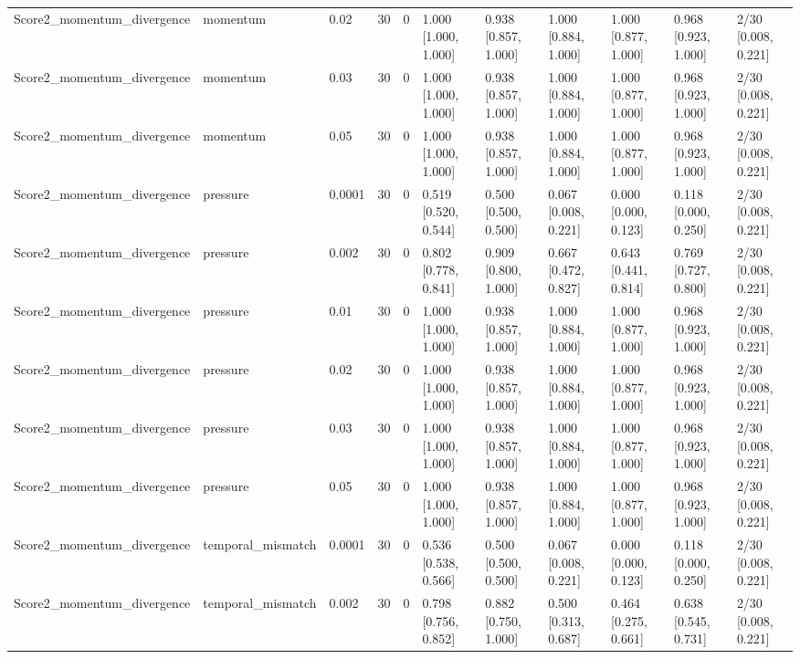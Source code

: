 \begin{longtable}{lllllllllll}
Score2\_momentum\_divergence & momentum & 0.02 & 30 & 0 & 1.000 [1.000, 1.000] & 0.938 [0.857, 1.000] & 1.000 [0.884, 1.000] & 1.000 [0.877, 1.000] & 0.968 [0.923, 1.000] & 2/30 [0.008, 0.221] \\
Score2\_momentum\_divergence & momentum & 0.03 & 30 & 0 & 1.000 [1.000, 1.000] & 0.938 [0.857, 1.000] & 1.000 [0.884, 1.000] & 1.000 [0.877, 1.000] & 0.968 [0.923, 1.000] & 2/30 [0.008, 0.221] \\
Score2\_momentum\_divergence & momentum & 0.05 & 30 & 0 & 1.000 [1.000, 1.000] & 0.938 [0.857, 1.000] & 1.000 [0.884, 1.000] & 1.000 [0.877, 1.000] & 0.968 [0.923, 1.000] & 2/30 [0.008, 0.221] \\
Score2\_momentum\_divergence & pressure & 0.0001 & 30 & 0 & 0.519 [0.520, 0.544] & 0.500 [0.500, 0.500] & 0.067 [0.008, 0.221] & 0.000 [0.000, 0.123] & 0.118 [0.000, 0.250] & 2/30 [0.008, 0.221] \\
Score2\_momentum\_divergence & pressure & 0.002 & 30 & 0 & 0.802 [0.778, 0.841] & 0.909 [0.800, 1.000] & 0.667 [0.472, 0.827] & 0.643 [0.441, 0.814] & 0.769 [0.727, 0.800] & 2/30 [0.008, 0.221] \\
Score2\_momentum\_divergence & pressure & 0.01 & 30 & 0 & 1.000 [1.000, 1.000] & 0.938 [0.857, 1.000] & 1.000 [0.884, 1.000] & 1.000 [0.877, 1.000] & 0.968 [0.923, 1.000] & 2/30 [0.008, 0.221] \\
Score2\_momentum\_divergence & pressure & 0.02 & 30 & 0 & 1.000 [1.000, 1.000] & 0.938 [0.857, 1.000] & 1.000 [0.884, 1.000] & 1.000 [0.877, 1.000] & 0.968 [0.923, 1.000] & 2/30 [0.008, 0.221] \\
Score2\_momentum\_divergence & pressure & 0.03 & 30 & 0 & 1.000 [1.000, 1.000] & 0.938 [0.857, 1.000] & 1.000 [0.884, 1.000] & 1.000 [0.877, 1.000] & 0.968 [0.923, 1.000] & 2/30 [0.008, 0.221] \\
Score2\_momentum\_divergence & pressure & 0.05 & 30 & 0 & 1.000 [1.000, 1.000] & 0.938 [0.857, 1.000] & 1.000 [0.884, 1.000] & 1.000 [0.877, 1.000] & 0.968 [0.923, 1.000] & 2/30 [0.008, 0.221] \\
Score2\_momentum\_divergence & temporal\_mismatch & 0.0001 & 30 & 0 & 0.536 [0.538, 0.566] & 0.500 [0.500, 0.500] & 0.067 [0.008, 0.221] & 0.000 [0.000, 0.123] & 0.118 [0.000, 0.250] & 2/30 [0.008, 0.221] \\
Score2\_momentum\_divergence & temporal\_mismatch & 0.002 & 30 & 0 & 0.798 [0.756, 0.852] & 0.882 [0.750, 1.000] & 0.500 [0.313, 0.687] & 0.464 [0.275, 0.661] & 0.638 [0.545, 0.731] & 2/30 [0.008, 0.221] \\

\end{longtable}

